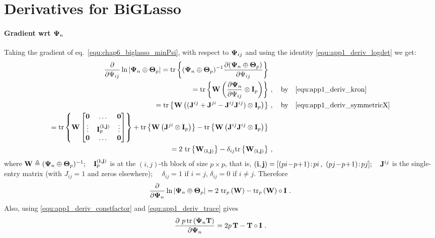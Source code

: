 

  \section{Derivatives for BiGLasso} \label{sec:app1_deriv_biglasso}
  
    \paragraph{Gradient wrt $\mathbf{\Psi}_n$} Taking the gradient of eq.~\eqref{equ:chap6_biglasso_minPsi}, with respect to $\mathbf{\Psi}_{ij}$ and using the identity \eqref{equ:app1_deriv_logdet} we get:
    \begin{align*}
        \frac{\partial}{\partial \Psi_{ij}}\ln| \mathbf{\Psi}_n \oplus \mathbf{\Theta}_p |
        = \textrm{tr} \left\{ (\mathbf{\Psi}_n \oplus \mathbf{\Theta}_p)^{-1}  \frac{\partial (\mathbf{\Psi}_n \oplus \mathbf{\Theta}_p)}{\partial  \Psi_{ij}} \right\}& \\
        = \textrm{tr} \left\{ \mathbf{W} \left(\frac{\partial \mathbf{\Psi}_n }{\partial  \Psi_{ij}} \otimes \mathbf{I}_p \right) \right\}&~, \quad \textrm{by} \quad \eqref{equ:app1_deriv_kron} \\
        = \textrm{tr} \left\{ \mathbf{W} \left( (\mathbf{J}^{ij}+\mathbf{J}^{ji} - \mathbf{J}^{ij}\mathbf{J}^{ij}) \otimes \mathbf{I}_p \right) \right\}&~, \quad \textrm{by} \quad \eqref{equ:app1_deriv_symmetricX} \\
        = \textrm{tr} \left\{ \mathbf{W} \begin{bmatrix}  \mathbf{0} & \dots & \mathbf{0}  \\ \vdots & \mathbf{I}_p^{(\mathbf{i},\mathbf{j})} & \vdots \\ \mathbf{0} & \dots & \mathbf{0}  \end{bmatrix}  \right\} + \textrm{tr} \left\{ \mathbf{W} \left( \mathbf{J}^{ji} \otimes \mathbf{I}_p \right) \right\} - \textrm{tr} \left\{ \mathbf{W} \left( \mathbf{J}^{ij}\mathbf{J}^{ij} \otimes \mathbf{I}_p \right) \right\} \\
        = 2 ~\textrm{tr} \left\{ \mathbf{W}_{(\mathbf{i},\mathbf{j})}  \right\} - \delta_{ij} \textrm{tr} \left\{ \mathbf{W}_{(\mathbf{i},\mathbf{j})}  \right\}& ~,\\
    \end{align*}
    where $\mathbf{W} \triangleq (\mathbf{\Psi}_n \oplus \mathbf{\Theta}_p)^{-1};\quad \mathbf{I}_p^{(\mathbf{i},\mathbf{j})}$ is at the $(i,j)$-th block of size $p \times p$, that is, $(\mb{i},\mb{j}) = [(pi\!-\!p\!+\!1)\!:\!pi \,,~ (pj\!-\!p\!+\!1)\!:\!pj]; \quad \mb{J}^{ij}$ is the single-entry matrix (with $J_{ij}=1$ and zeros elsewhere); $\quad \delta_{ij}=1$ if $i=j$, $\delta_{ij}=0$ if $i\neq j$.
    Therefore
    \begin{equation} \label{equ:app1_derivPsi_part1}
      \frac{\partial}{\partial \mathbf{\Psi}_n} \ln|\mathbf{\Psi}_n \oplus \mathbf{\Theta}_p| = 2 ~ \textrm{tr}_p \left( \mathbf{W} \right) - \textrm{tr}_p \left( \mathbf{W} \right) \circ \mathbf{I} ~.
    \end{equation}
    Also, using \eqref{equ:app1_deriv_constfactor} and \eqref{equ:app1_deriv_trace} gives
    \begin{equation} \label{equ:app1_derivPsi_part2}
      \frac{\partial ~p\,\textrm{tr} \left( \mathbf{\Psi}_n \mathbf{T} \right)}{\partial \mathbf{\Psi}_n}  = 2p\,\mathbf{T} - \mathbf{T} \circ \mathbf{I}~.
    \end{equation}
    
